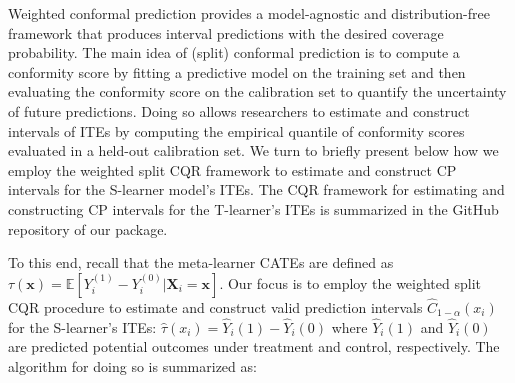 Weighted conformal prediction provides a model-agnostic and
distribution-free framework that produces interval predictions with the
desired coverage probability. The main idea of (split) conformal
prediction is to compute a conformity score by fitting a predictive
model on the training set and then evaluating the conformity score on
the calibration set to quantify the uncertainty of future predictions.
Doing so allows researchers to estimate and construct intervals of ITEs
by computing the empirical quantile of conformity scores evaluated in a
held-out calibration set. We turn to briefly present below how we employ
the weighted split CQR framework to estimate and construct CP intervals
for the S-learner model's ITEs. The CQR framework for estimating and
constructing CP intervals for the T-learner's ITEs is summarized in the
GitHub repository of our package.

To this end, recall that the meta-learner CATEs are defined as
\(\tau\left(\mathbf{x}\right)=\mathbb{E}\left[Y_{i}^{\left(1\right)}-Y_{i}^{\left(0\right)}|{\mathbf{X}_{i}}=\mathbf{x}\right]\).
Our focus is to employ the weighted split CQR procedure to estimate and
construct valid prediction intervals \(\widehat{C}_{1-\alpha}(x_{i})\) for
the S-learner's ITEs:
\(\widehat{\tau}(x_{i})=\widehat{Y}_{i}(1)-\widehat{Y}_{i}(0)\) where
\(\widehat{Y}_{i}(1)\) and \(\widehat{Y}_{i}(0)\) are predicted potential
outcomes under treatment and control, respectively. The algorithm for
doing so is summarized as:

